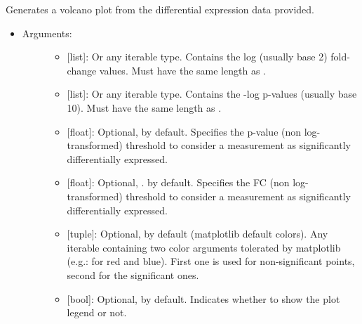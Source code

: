 \documentclass[letterpaper,10pt,english]{sphinxmanual}
\begin{document}
\begin{fulllineitems}
\label{\detokenize{plots:data_tools.plots.volcano}}
Generates a volcano plot from the differential expression data
provided.
\begin{itemize}
\item {} \begin{description}
\item[{Arguments:}] \leavevmode\begin{itemize}
\item {} 
 {[}list{]}: Or any iterable type. Contains the log
(usually base 2) fold-change values. Must have the same length
as .

\item {} 
 {[}list{]}: Or any iterable type. Contains the -log
p-values (usually base 10). Must have the same length as
.

\item {} 
 {[}float{]}: Optional,  by default. Specifies
the p-value (non log-transformed) threshold to consider a
measurement as significantly differentially expressed.

\item {} 
 {[}float{]}: Optional, . by default. Specifies the
FC (non log-transformed) threshold to consider a measurement
as significantly differentially expressed.

\item {} 
 {[}tuple{]}: Optional,  by default (matplotlib
default colors). Any iterable containing two color arguments
tolerated by matplotlib (e.g.: \sphinxcode{\sphinxupquote{{[}'r', 'b'{]}}} for red and
blue). First one is used for non-significant points, second
for the significant ones.

\item {} 
 {[}bool{]}: Optional,  by default. Indicates
whether to show the plot legend or not.


\end{itemize}
\end{description}
\end{itemize}
\end{fulllineitems}
\end{document}
